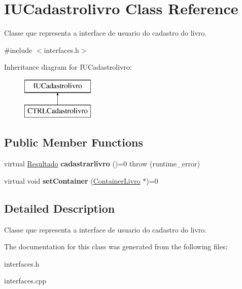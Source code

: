 \hypertarget{classIUCadastrolivro}{}\section{I\+U\+Cadastrolivro Class Reference}
\label{classIUCadastrolivro}


Classe que representa a interface de usuario do cadastro do livro.  




{\ttfamily \#include $<$interfaces.\+h$>$}

Inheritance diagram for I\+U\+Cadastrolivro\+:\begin{figure}[H]
\begin{center}
\leavevmode
\includegraphics[height=2.000000cm]{classIUCadastrolivro}
\end{center}
\end{figure}
\subsection*{Public Member Functions}
\begin{DoxyCompactItemize}
\item 
\mbox{\label{classIUCadastrolivro_a356b23a58950960453d24732018432e1}} 
virtual \hyperlink{classResultado}{Resultado} {\bfseries cadastrarlivro} ()=0  throw (runtime\+\_\+error)
\item 
\mbox{\label{classIUCadastrolivro_a1fbea2206e6ba1ce83d990b26ea4619a}} 
virtual void {\bfseries set\+Container} (\hyperlink{classContainerLivro}{Container\+Livro} $\ast$)=0
\end{DoxyCompactItemize}


\subsection{Detailed Description}
Classe que representa a interface de usuario do cadastro do livro. 

The documentation for this class was generated from the following files\+:\begin{DoxyCompactItemize}
\item 
interfaces.\+h\item 
interfaces.\+cpp\end{DoxyCompactItemize}
